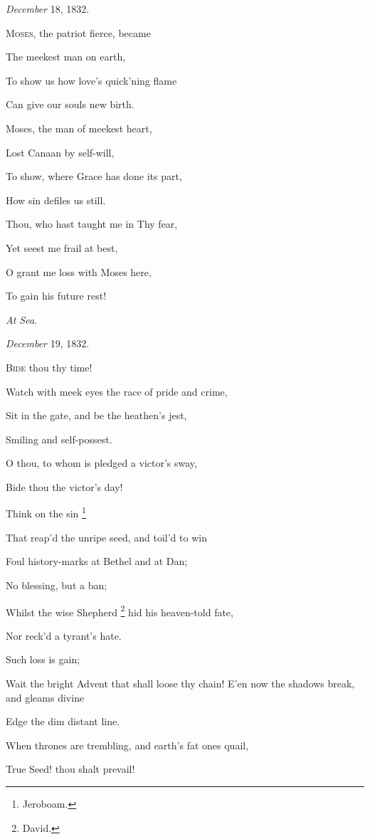 \emph{December} 18, 1832.


M\textsc{oses}, the patriot fierce, became

The meekest man on earth,

To show us how love's quick'ning flame

Can give our souls new birth.

Moses, the man of meekest heart,

Lost Canaan by self-will,

To show, where Grace has done its part,

How sin defiles us still.

Thou, who hast taught me in Thy fear,

Yet seest me frail at best,

O grant me loss with Moses here,

To gain his future rest!

\emph{At Sea}.

\emph{December} 19, 1832.


B\textsc{ide}
thou thy time!

Watch with meek eyes the race of pride and crime,

Sit in the gate, and be the heathen's jest,

Smiling
and self-possest.

O thou, to whom is pledged a victor's sway,

Bide
thou the victor's day!

Think on
the sin \footnote{Jeroboam.}

That reap'd the unripe seed, and toil'd to win

Foul history-marks at Bethel and at Dan;

No
blessing, but a ban;

Whilst the wise Shepherd \footnote{David.} hid his heaven-told fate,

Nor
reck'd a tyrant's hate.

Such loss
is gain;

Wait the bright Advent that shall loose thy chain! E'en now the shadows break, and gleams divine

Edge
the dim distant line.

When thrones are trembling, and earth's fat ones quail,

True
Seed! thou shalt prevail!


